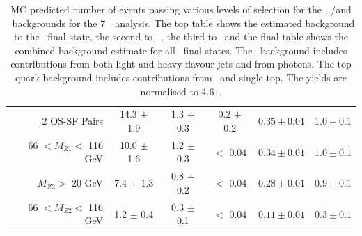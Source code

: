 \begin{table}[htbp]
\begin{tabular}{rccccc}
       2 OS-SF Pairs        &  14.3 $\pm$ 1.9 & 1.3 $\pm$ 0.3 & 0.2 $\pm$ 0.2   & $0.35 \pm 0.01$ & $1.0 \pm 0.1$ \\ 
66 $ < M_{Z1} < $ 116 GeV   &  10.0 $\pm$ 1.6 & 1.2 $\pm$ 0.3 & $<$ 0.04        & $0.34 \pm 0.01$ & $1.0 \pm 0.1$ \\ 
  $M_{Z2} > $ 20 GeV        &  7.4  $\pm$ 1.3 & 0.8 $\pm$ 0.2 & $<$ 0.04        & $0.28 \pm 0.01$ & $0.9 \pm 0.1$ \\ 
66 $ < M_{Z2} < $ 116 GeV   &  1.2  $\pm$ 0.4 & 0.3 $\pm$ 0.1 & $<$ 0.04        & $0.11 \pm 0.01$ & $0.3 \pm 0.1$ \\ 
    \hline\hline
  \end{tabular}
  \caption[MC predicted number of events passing various levels of selection for
  the \ZX, \WZ/\WW and \topquark\ backgrounds for the 7~\tev\ analysis.]
  {MC predicted number of events passing various levels of selection for
  the \ZX, \WZ/\WW and \topquark\ backgrounds for the 7~\tev\ analysis. The top table shows the estimated background to the \eeee\
  final state, the second to \mmmm\ , the third to \eemm\ and
  the final table shows the combined background estimate for all \llll\ final
  states. The
  \ZX\ background includes contributions from both light and heavy flavour
  jets and from photons. The top quark background includes contributions from \ttbar\ and
  single top. The yields are normalised to 4.6~\ifb.
  }
  \label{table:mc-bg-seven}
\end{table}

